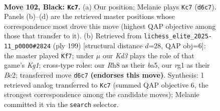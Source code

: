 \documentclass[11pt]{article}
\begin{document}
\begin{figure}[p]\centering
\begin{subfigure}{0.46\textwidth}\centering
\resizebox{\linewidth}{!}{%
\newchessgame
\chessboard[
  setfen={7r/8/p2k4/P1p2p1p/1p3P1P/4P1PK/1P6/6R1 b - - 16 102},
  showmover=false,
  pgfstyle=straightmove, color=movearrow, markmove={d6-c7}
]}
\caption{}
\end{subfigure}\hfill
\begin{subfigure}{0.46\textwidth}\centering
\resizebox{\linewidth}{!}{%
\newchessgame
\chessboard[
  setfen={6k1/6p1/p4p1p/Bp1p3P/3P2P1/P1P1KP2/2b5/8 b - - 80 100},
  showmover=false,
  pgfstyle=straightmove, color=movearrow, markmove={g8-f7}
]}
\caption{}
\end{subfigure}
\\[4pt]

\caption{\textbf{Move 102, Black: \texttt{Kc7}.} (a) Our position; Melanie plays \texttt{Kc7} (\texttt{d6c7}). Panels (b)--(d) are the retrieved master positions whose correspondence most drove this move (highest QAP objective among those that transfer to it). (b) Retrieved from \texttt{lichess\_elite\_2025-11\_p0000\#2824} (ply 199) [structural distance $d$=28, QAP obj=6]: the master played \texttt{Kf7}; under $\mu$ our \emph{Kd3} plays the role of that game's \emph{Kg1}; cross-type roles: our \emph{R}h8 as their \emph{b}a5, our \emph{r}g1 as their \emph{B}c2; transferred move \texttt{d6c7} \textbf{(endorses this move)}. Synthesis: 1 retrieved analog transferred to \texttt{Kc7} (summed QAP objective 6, the strongest correspondence among the candidate moves); Melanie committed it via the \texttt{search} selector.}
\label{fig:thought-m203}
\end{figure}

\clearpage
\end{document}
